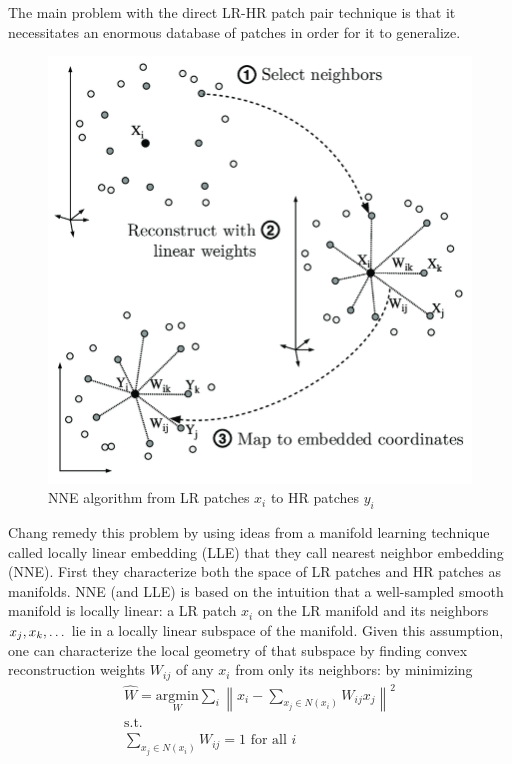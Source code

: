 The main problem with the direct LR-HR patch pair technique is that it necessitates an enormous database of patches in order for it to generalize.
%
\begin{figure}
    \centering
    \includegraphics[width=\linewidth,keepaspectratio]{figures/lle.png}
    \caption{NNE algorithm from LR patches $x_i$ to HR patches $y_i$\cite{Guillermophdthesis}}
    \label{fig:lle}
\end{figure}
Chang \etal remedy this problem by using ideas from a manifold learning technique called locally linear embedding\cite{saul2000introduction} (LLE) that they call nearest neighbor embedding (NNE).
%
First they characterize both the space of LR patches and HR patches as manifolds.
%
NNE (and LLE) is based on the intuition that a well-sampled smooth manifold is locally linear: a LR patch $x_i$ on the LR manifold and its neighbors $x_j, x_k, \mathellipsis$ lie in a locally linear subspace of the manifold.
%
Given this assumption, one can characterize the local geometry of that subspace by finding convex reconstruction weights $W_{ij}$ of any $x_i$ from only its neighbors: by minimizing
\begin{equation}
    \begin{split}
        \hat{W} = \underset{W}{\text{argmin}} \sum_i \left\| x_i - \sum_{x_j \in N(x_i)} W_{ij} x_j  \right\|^2 \\
        \text{s.t.} \\
        \sum_{x_j \in N(x_i)} W_{ij} = 1 \text{ for all }i
    \end{split}
\end{equation}
